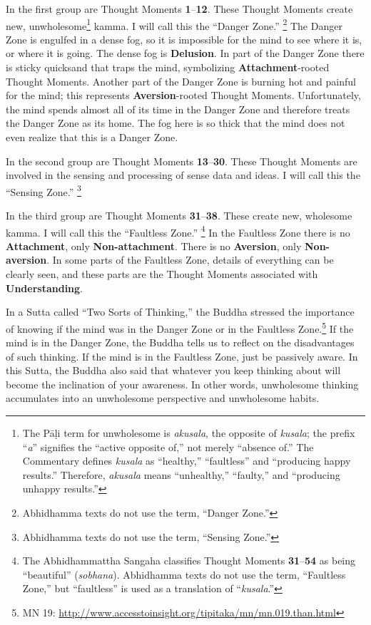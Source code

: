 In the first group are Thought Moments \textbf{1}--\textbf{12}. These Thought Moments create new, unwholesome\footnote{The Pāḷi term for unwholesome is \textit{akusala}, the opposite of \textit{kusala}; the prefix “\textit{a}” signifies the “active opposite of,” not merely “absence of.” The Commentary defines \textit{kusala} as “healthy,” “faultless” and “producing happy results.” Therefore, \textit{akusala} means “unhealthy,” “faulty,” and “producing unhappy results.”} kamma. I will call this the “Danger Zone.” \footnote{Abhidhamma texts do not use the term, “Danger Zone.”} The Danger Zone is engulfed in a dense fog, so it is impossible for the mind to see where it is, or where it is going. The dense fog is \textbf{Delusion}. In part of the Danger Zone there is sticky quicksand that traps the mind, symbolizing \textbf{Attachment}-rooted Thought Moments. Another part of the Danger Zone is burning hot and painful for the mind; this represents \textbf{Aversion}-rooted Thought Moments. Unfortunately, the mind spends almost all of its time in the Danger Zone and therefore treats the Danger Zone as its home. The fog here is so thick that the mind does not even realize that this is a Danger Zone.

In the second group are Thought Moments \textbf{13}--\textbf{30}. These Thought Moments are involved in the sensing and processing of sense data and ideas. I will call this the “Sensing Zone.” \footnote{Abhidhamma texts do not use the term, “Sensing Zone.”}

In the third group are Thought Moments \textbf{31}--\textbf{38}. These create new, wholesome kamma. I will call this the “Faultless Zone.” \footnote{The Abhidhammattha Sangaha classifies Thought Moments \textbf{31}--\textbf{54} as being “beautiful” (\textit{sobhana}). Abhidhamma texts do not use the term, “Faultless Zone,” but “faultless” is used as a translation of “\textit{kusala}.”} In the Faultless Zone there is no \textbf{Attachment}, only \textbf{Non-attachment}. There is no \textbf{Aversion}, only \textbf{Non-aversion}. In some parts of the Faultless Zone, details of everything can be clearly seen, and these parts are the Thought Moments associated with \textbf{Understanding}.

In a Sutta called “Two Sorts of Thinking,” the Buddha stressed the importance of knowing if the mind was in the Danger Zone or in the Faultless Zone.\footnote{MN 19: \url{http://www.accesstoinsight.org/tipitaka/mn/mn.019.than.html}} If the mind is in the Danger Zone, the Buddha tells us to reflect on the disadvantages of such thinking. If the mind is in the Faultless Zone, just be passively aware. In this Sutta, the Buddha also said that whatever you keep thinking about will become the inclination of your awareness. In other words, unwholesome thinking accumulates into an unwholesome perspective and unwholesome habits.

